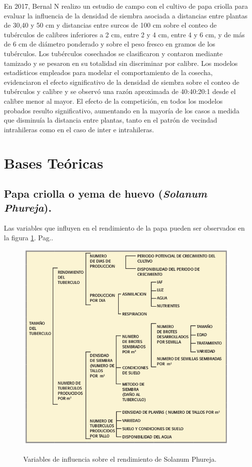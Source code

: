 En 2017, Bernal N realizo un estudio de campo con el cultivo de papa criolla para evaluar la influencia de la densidad de siembra asociada a distancias entre plantas de 30,40 y 50 cm y distancias entre surcos de 100 cm sobre el conteo de tubérculos de calibres inferiores a 2 cm, entre 2 y 4 cm, entre 4 y 6 cm, y de más de 6 cm de diámetro ponderado y sobre el peso fresco en gramos de los tubérculos. Los tubérculos cosechados se clasificaron y contaron mediante tamizado y se pesaron en su totalidad sin discriminar por calibre. Los modelos estadísticos empleados para modelar el comportamiento de la cosecha, evidenciaron el efecto significativo de la densidad de siembra sobre el conteo de tubérculos y calibre y se observó una razón aproximada de 40:40:20:1 desde el calibre menor al mayor. El efecto de la competición, en todos los modelos probados resulto significativo, aumentando en la mayoría de los casos a medida que disminuía la distancia entre plantas, tanto en el patrón de vecindad intrahileras como en el caso de inter e intrahileras.

\section{Bases Teóricas}

\subsection{Papa criolla o yema de huevo (\textit{Solanum Phureja}).}

Las variables que influyen en el rendimiento de la papa pueden ser observados en la figura \ref{fig:arch}. Pag.\pageref{fig:arch}.\\
\begin{figure}[h]
	\caption{Variables de influencia sobre el rendimiento de Solanum Phureja.}
	\centering
	\includegraphics[scale=0.5]{variables.png}
	\label{fig:arch}
\end{figure}

